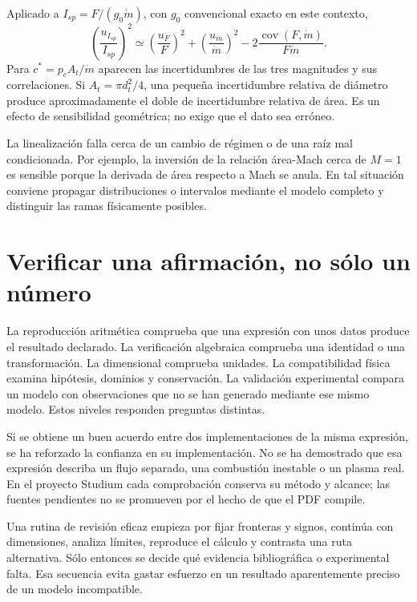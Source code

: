 Aplicado a $I_{sp}=F/(g_0\dot m)$, con $g_0$ convencional exacto en este contexto,
\begin{equation}
 \left(\frac{u_{I_{sp}}}{I_{sp}}\right)^2\simeq
 \left(\frac{u_F}{F}\right)^2+
 \left(\frac{u_{\dot m}}{\dot m}\right)^2
 -2\frac{\operatorname{cov}(F,\dot m)}{F\dot m}.
\end{equation}
Para $c^*=p_cA_t/\dot m$ aparecen las incertidumbres de las tres magnitudes y sus correlaciones. Si $A_t=\pi d_t^2/4$, una pequeña incertidumbre relativa de diámetro produce aproximadamente el doble de incertidumbre relativa de área. Es un efecto de sensibilidad geométrica; no exige que el dato sea erróneo.

La linealización falla cerca de un cambio de régimen o de una raíz mal condicionada. Por ejemplo, la inversión de la relación área-Mach cerca de $M=1$ es sensible porque la derivada de área respecto a Mach se anula. En tal situación conviene propagar distribuciones o intervalos mediante el modelo completo y distinguir las ramas físicamente posibles.
\section{Verificar una afirmación, no sólo un número}
La reproducción aritmética comprueba que una expresión con unos datos produce el resultado declarado. La verificación algebraica comprueba una identidad o una transformación. La dimensional comprueba unidades. La compatibilidad física examina hipótesis, dominios y conservación. La validación experimental compara un modelo con observaciones que no se han generado mediante ese mismo modelo. Estos niveles responden preguntas distintas.

Si se obtiene un buen acuerdo entre dos implementaciones de la misma expresión, se ha reforzado la confianza en su implementación. No se ha demostrado que esa expresión describa un flujo separado, una combustión inestable o un plasma real. En el proyecto Studium cada comprobación conserva su método y alcance; las fuentes pendientes no se promueven por el hecho de que el PDF compile.

Una rutina de revisión eficaz empieza por fijar fronteras y signos, continúa con dimensiones, analiza límites, reproduce el cálculo y contrasta una ruta alternativa. Sólo entonces se decide qué evidencia bibliográfica o experimental falta. Esa secuencia evita gastar esfuerzo en un resultado aparentemente preciso de un modelo incompatible.
